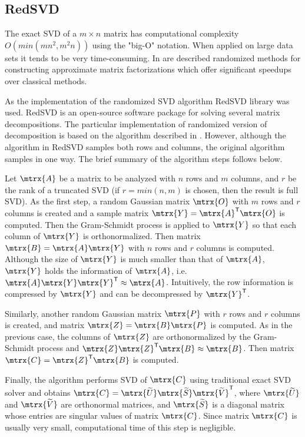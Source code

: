 \subsection{RedSVD}

The exact SVD of a $m \times n$ matrix has computational complexity \newline $O(min(mn^2, m^2n))$ using the "big-O" notation. When applied on large data sets it tends to be very time-consuming. In \cite{Candes2011, Woolfe2008, Martinsson2011, Szlam2014} are described randomized methods for constructing approximate matrix factorizations which offer significant speedups over classical methods.

As the implementation of the randomized SVD algorithm RedSVD library was used. RedSVD is an open-source software package for solving several matrix decompositions. The particular implementation of randomized version of decomposition is based on the algorithm described in \cite{Halko2011}. However, although the algorithm in RedSVD samples both rows and columns, the original algorithm samples in one way. The brief summary of the algorithm steps follows below.

Let $\mtrx{A}$ be a matrix to be analyzed with $n$ rows and $m$ columns, and $r$ be the rank of a truncated SVD (if $r = min(n, m)$ is chosen, then the result is full SVD). As the first step, a random Gaussian matrix $\mtrx{O}$ with $m$ rows and $r$ columns is created and a sample matrix $\mtrx{Y} = \mtrx{A}^{\mathsf{T}} \mtrx{O}$ is computed. Then the Gram-Schmidt process is applied to $\mtrx{Y}$ so that each column of $\mtrx{Y}$ is orthonormalized. Then matrix $\mtrx{B} = \mtrx{A}\mtrx{Y}$ with $n$ rows and $r$ columns is computed. Although the size of $\mtrx{Y}$ is much smaller than that of $\mtrx{A}$, $\mtrx{Y}$ holds the information of $\mtrx{A}$, i.e. $\mtrx{A}\mtrx{Y}\mtrx{Y}^{\mathsf{T}} \approx \mtrx{A}$. Intuitively, the row information is compressed by $\mtrx{Y}$ and can be decompressed by $\mtrx{Y}^{\mathsf{T}}$.

Similarly, another random Gaussian matrix $\mtrx{P}$ with $r$ rows and $r$ columns is created, and matrix $\mtrx{Z} = \mtrx{B}\mtrx{P}$ is computed. As in the previous case, the columns of $\mtrx{Z}$ are orthonormalized by the Gram-Schmidt process and $\mtrx{Z}\mtrx{Z}^{\mathsf{T}} \mtrx{B} \approx \mtrx{B}$. Then matrix $\mtrx{C} = \mtrx{Z}^{\mathsf{T}} \mtrx{B}$ is computed.

Finally, the algorithm performs SVD of $\mtrx{C}$ using traditional exact SVD solver and obtains $\mtrx{C} = \mtrx{\widetilde{U}}\mtrx{\widetilde{S}}\mtrx{\widetilde{V}}^{\mathsf{T}}$, where $\mtrx{\widetilde{U}}$ and $\mtrx{\widetilde{V}}$ are orthonormal matrices, and $\mtrx{\widetilde{S}}$ is a diagonal matrix whose entries are singular values of matrix $\mtrx{C}$. Since matrix $\mtrx{C}$ is usually very small, computational time of this step is negligible.

